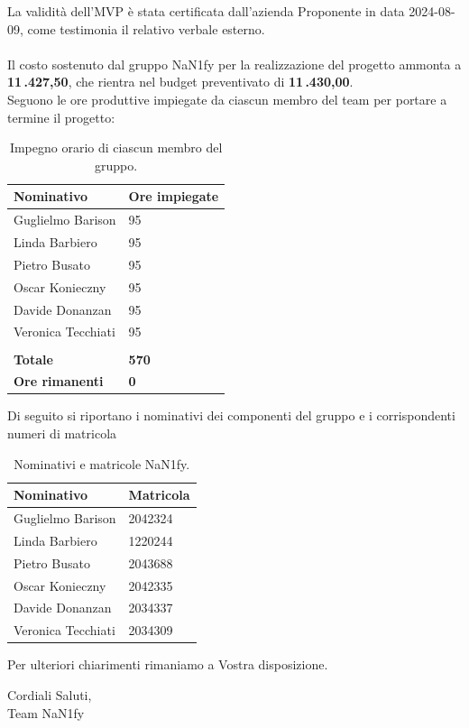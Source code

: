 \documentclass[8pt]{article}
\begin{document}
La validità dell'MVP è stata certificata dall'azienda Proponente in data 2024-08-09, come testimonia il relativo verbale esterno. \\\\
Il costo sostenuto dal gruppo NaN1fy per la realizzazione del progetto ammonta a \textbf{11\,.427,50\;\texteuro}, che rientra nel budget preventivato di \textbf{11\,.430,00\;\texteuro}. \\ Seguono le ore produttive impiegate da ciascun membro del team per portare a termine il progetto:
\begin{table}[H]
	\centering
	\begin{tabular}{p{3cm} p{3cm}}
		\toprule
		\textbf{Nominativo} & \textbf{Ore impiegate} \\
		\midrule
		Guglielmo Barison & 95 \\
		Linda Barbiero &  95 \\
		Pietro Busato & 95 \\
		Oscar Konieczny & 95 \\
		Davide Donanzan & 95 \\
		Veronica Tecchiati & 95 \\\\
            \textbf{Totale} & \textbf{570} \\
            \textbf{Ore rimanenti} & \textbf{0} \\
		\bottomrule
	\end{tabular}
	\caption{Impegno orario di ciascun membro del gruppo.}
	\label{table:Impegno orario di ciascun membro del gruppo}
\end{table}
Di seguito si riportano i nominativi dei componenti del gruppo e i corrispondenti numeri di matricola\\
\begin{table}[H]
	\centering
	\begin{tabular}{p{3cm} p{3cm}}
		\toprule
		\textbf{Nominativo} & \textbf{Matricola} \\
		\midrule
		Guglielmo Barison & 2042324 \\
		Linda Barbiero &  1220244 \\
		Pietro Busato & 2043688 \\
		Oscar Konieczny & 2042335 \\
		Davide Donanzan & 2034337 \\
		Veronica Tecchiati & 2034309 \\
		\bottomrule
	\end{tabular}
	\caption{Nominativi e matricole NaN1fy.}
	\label{table:Nominativi e matricole NaN1fy}
\end{table}
Per ulteriori chiarimenti rimaniamo a Vostra disposizione.
\vspace{1em}
\begin{flushleft}
	Cordiali Saluti,\\
	Team NaN1fy
\end{flushleft}
\clearpage
\newpage
\justifying
\end{document}
